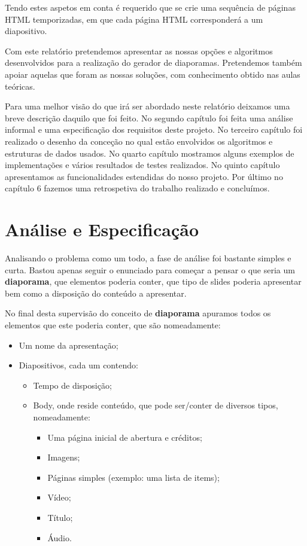 \documentclass[11pt,a4paper]{report}
\begin{document}
Tendo estes aspetos em conta é requerido que se crie uma sequência de páginas HTML temporizadas, em que cada página HTML corresponderá a um diapositivo.

Com este relatório pretendemos apresentar as nossas opções e algoritmos desenvolvidos para a realização do gerador de diaporamas. Pretendemos também apoiar aquelas que foram as nossas soluções, com conhecimento obtido nas aulas teóricas.

Para uma melhor visão do que irá ser abordado neste relatório deixamos uma breve descrição daquilo que foi feito. No segundo capítulo foi feita uma análise informal e uma especificação dos requisitos deste projeto. No terceiro capítulo foi realizado o desenho da conceção no qual estão envolvidos os algoritmos e estruturas de dados usados. No quarto capítulo mostramos alguns exemplos de implementações e vários resultados de testes realizados. No quinto capítulo apresentamos as funcionalidades estendidas do nosso projeto. Por último no capítulo 6 fazemos uma retrospetiva do trabalho realizado e concluímos.


\chapter{Análise e Especificação}
\label{chap:analise}

Analisando o problema como um todo, a fase de análise foi bastante simples e curta. Bastou apenas seguir o enunciado para começar a pensar o que seria um \textbf{diaporama}, que elementos poderia conter, que tipo de slides poderia apresentar bem como a disposição do conteúdo a apresentar.

No final desta supervisão do conceito de \textbf{diaporama} apuramos todos os elementos que este poderia conter, que são nomeadamente:

\begin{itemize}
	\item Um nome da apresentação;
	\item Diapositivos, cada um contendo:
	\begin{itemize}
		\item Tempo de disposição;
		\item Body, onde reside conteúdo, que pode ser/conter de diversos tipos, nomeadamente:
		\begin{itemize}
			\item Uma página inicial de abertura e créditos;
			\item Imagens;
			\item Páginas simples (exemplo:  uma lista de items);
			\item Vídeo;
			\item Título;
			\item Áudio.
		\end{itemize}
	\end{itemize}
\end{itemize}
\end{document}
